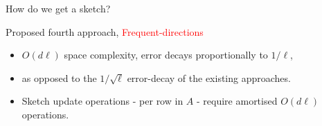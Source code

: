 \documentclass[first=dgreen,second=purple,logo=redque]{aaltoslides}
\newcommand{\vectornorm}[1]{\left\|#1\right\|}
\begin{document}
\begin{frame}[allowframebreaks=1]{How do we get a sketch?}
\begin{itemize}
\end{itemize}

\framebreak
Proposed fourth approach, \textcolor{red}{Frequent-directions}
\begin{itemize}
	\item $O(d\ell)$ space complexity, error decays proportionally to $1/\ell$,
	\item as opposed to the $1/\sqrt{\ell}$ error-decay of the existing approaches.
	\item Sketch update operations - per row in $A$ - require \textcolor{dgreen}{amortised} $O(d\ell)$ operations.
	
\end{itemize}
\end{frame}
\end{document}
